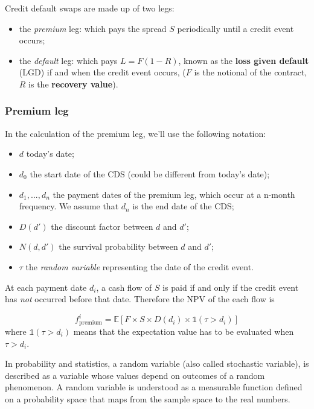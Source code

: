 Credit default swaps are made up of two legs:

\begin{itemize}
\tightlist
\item
  the \emph{premium} leg: which pays the spread \(S\) periodically until a credit event occurs;
\item
  the \emph{default} leg: which pays \(L = F(1 - R)\), known as the
  \textbf{loss given default} (LGD) if and when the credit event occurs, ($F$ is the notional of the contract, $R$ is the \textbf{recovery value}).
\end{itemize}

\subsubsection{Premium leg}\label{premium-leg}

In the calculation of the premium leg, we'll use the following notation:

\begin{itemize}
\tightlist
\item
  \(d\) today's date;
\item
  \(d_0\) the start date of the CDS (could be different from today's date);
\item
  \(d_1, ..., d_n\) the payment dates of the premium leg, which occur at
  a n-month frequency. We assume that \(d_n\) is the end date of the CDS;
\item
  \(D(d')\) the discount factor between \(d\) and \(d'\);
\item
  \(N(d, d')\) the survival probability between \(d\) and \(d'\);
\item
  \(\tau\) the \emph{random variable} representing the date of the credit event.
\end{itemize}

At each payment date \(d_i\), a cash flow of \(S\) is paid if and only if the
credit event has \emph{not} occurred before that date. Therefore the NPV of the
each flow is

\begin{equation}
f_{\textrm{premium}}^i = \mathbb{E}\left[F\times S \times D(d_i) \times \mathbb{1}(\tau > d_i) \right]\end{equation}
where \(\mathbb{1}(\tau > d_i)\) means that the expectation value has to
be evaluated when \(\tau > d_i\). 

In probability and statistics, a random variable (also called stochastic variable), is described as a variable whose values depend on outcomes of a random phenomenon. A random variable is understood as a measurable function defined on a probability space that maps from the sample space to the real numbers.

